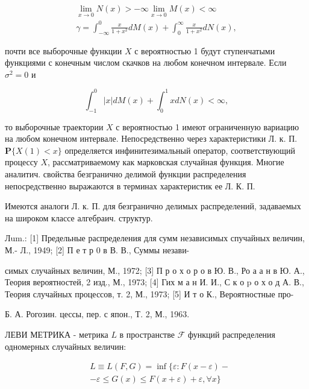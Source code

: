 \documentclass[10pt]{article}
\begin{document}
\[

\begin{gathered}

\lim _{x \rightarrow 0} N(x)>-\infty \lim _{x \rightarrow 0} M(x)<\infty \\

\gamma=\int_{-\infty}^{0} \frac{x}{1+x^{2}} d M(x)+\int_{0}^{\infty} \frac{x}{1+x^{2}} d N(x),

\end{gathered}

\]



почти все выборочные функции $X$ с вероятностью 1 будут ступенчатыми функциями с конечным числом скачков на любом конечном интервале. Если $\sigma^{2}=0$ и



\[

\int_{-1}^{0}|x| d M(x)+\int_{0}^{1} x d N(x)<\infty,

\]



то выборочные траектории $X$ с вероятностью 1 имеют ограниченную вариацию на любом конечном интервале. Непосредственно через характеристики Л. к. П. $\mathbf{P}\{X(1)<x\}$ определяется инфинитезимальный оператор, соответствующий процессу $X$, рассматриваемому как марковская случайная функция. Многие аналитич. свойства безгранично делимой функции распределения непосредственно выражаются в терминах характеристик ее Л. К. П.



Имеются аналоги Л. к. П. для безгранично делимых распределений, задаваемых на широком классе алгебраич. структур.



Лum.: [1] Предельные распределения для сумм независимых спучайных величин, М.- Л., 1949; [2] П е т р 0 в В. В., Суммы незави-

симых случайных величин, М., 1972; [3] П р о х о р о в Ю. В., Ро а а н в Ю. А., Теория вероятностей, 2 изд., М., 1973; [4] Гих м а н И. И., С к о p о х о д А. В., Теория случайных процессов, т. 2, М., 1973; [5] И т о К., Вероятностные про-

Б. А. Рогозин. цессы, пер. с япон., Т. 2, М., 1963.



ЛЕВИ МЕТРИКА - метрика $L$ в пространстве $\mathscr{F}$ функций распределения одномерных случайных величин:



\[

\begin{aligned}

& L \equiv L(F, G)=\inf \{\varepsilon: F(x-\varepsilon)- \\

& -\varepsilon \leqslant G(x) \leqslant F(x+\varepsilon)+\varepsilon, \forall x\}

\end{aligned}

\]
\end{document}
